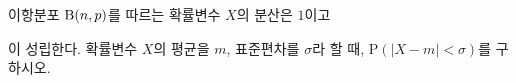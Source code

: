 이항분포 $\mathrm{B}(n{,}\mkern3mu\mathopen{}p)$를 따르는 확률변수 $X$의 분산은 $1$이고 \par\smallskip{}\par\smallskip\noindent 이 성립한다. 확률변수 $X$의 평균을 $m$, 표준편차를 $\sigma$라 할 때, $\mathrm{P}(|X-m|<\sigma)$를 구하시오.

